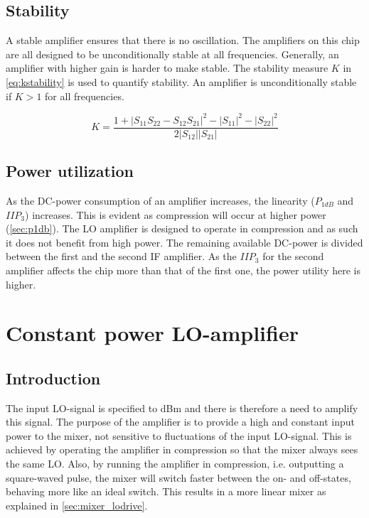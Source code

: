		\subsection{Stability}
			A stable amplifier ensures that there is no oscillation.\autocite{grosch99} The amplifiers on this chip are all designed to be unconditionally stable at all frequencies. Generally, an amplifier with higher gain is harder to make stable. The stability measure $K$ in \autoref{eq:kstability} is used to quantify stability. An amplifier is unconditionally stable if $K>1$ for all frequencies.

			\begin{equation}\label{eq:kstability}
				K=\frac{1+|S_{11}S_{22}-S_{12}S_{21}|^2-|S_{11}|^2-|S_{22}|^2}{2|S_{12}||S_{21}|}
			\end{equation}

		\subsection{Power utilization}\label{sec:power}
			As the DC-power consumption of an amplifier increases, the linearity ($P_{1dB}$ and $IIP_3$) increases. This is evident as compression will occur at higher power (\autoref{sec:p1db}). The LO amplifier is designed to operate in compression and as such it does not benefit from high power. The remaining available DC-power is divided between the first and the second IF amplifier. As the $IIP_3$ for the second amplifier affects the chip more than that of the first one, the power utility here is higher.

	\section{Constant power LO-amplifier}\label{sec:lo_amp}
		\subsection{Introduction}
			The input LO-signal is specified to \unit[-5--0]{dBm} and there is therefore a need to amplify this signal. The purpose of the amplifier is to provide a high and constant input power to the mixer, not sensitive to fluctuations of the input LO-signal. This is achieved by operating the amplifier in compression so that the mixer always sees the same LO. Also, by running the amplifier in compression, i.e. outputting a square-waved pulse, the mixer will switch faster between the on- and off-states, behaving more like an ideal switch. This results in a more linear mixer as explained in \autoref{sec:mixer_lodrive}.\autocite{vice03} %



